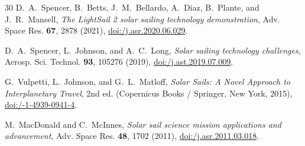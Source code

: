 \documentclass[aps,prd,reprint,superscriptaddress,nofootinbib,floatfix]{revtex4-2}
\begin{document}
\begin{thebibliography}{30}
 D.~A.~Spencer, B.~Betts, J.~M.~Bellardo, A.~Diaz, B.~Plante, and J.~R.~Mansell, \textit{The LightSail 2 solar sailing technology demonstration}, Adv. Space Res. \textbf{67}, 2878 (2021), \href{https://doi.org/10.1016/j.asr.2020.06.029}{doi:/\allowbreak j.asr.2020.06.029}.

 D.~A.~Spencer, L.~Johnson, and A.~C.~Long, \textit{Solar sailing technology challenges}, Aerosp. Sci. Technol. \textbf{93}, 105276 (2019), \href{https://doi.org/10.1016/j.ast.2019.07.009}{doi:/\allowbreak j.ast.2019.07.009}.

 G.~Vulpetti, L.~Johnson, and G.~L.~Matloff, \textit{Solar Sails: A Novel Approach to Interplanetary Travel}, 2nd ed. (Copernicus Books / Springer, New York, 2015), \href{https://doi.org/10.1007/978-1-4939-0941-4}{doi:/-1-4939-0941-4}.

 M.~MacDonald and C.~McInnes, \textit{Solar sail science mission applications and advancement}, Adv. Space Res. \textbf{48}, 1702 (2011), \href{https://doi.org/10.1016/j.asr.2011.03.018}{doi:/\allowbreak j.asr.2011.03.018}.

\end{thebibliography}
\endgroup
\end{document}
